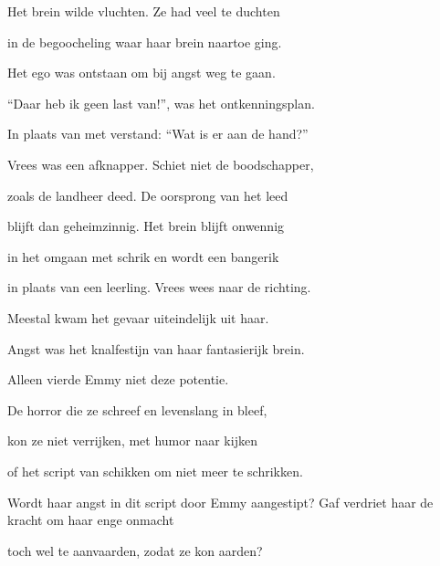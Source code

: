Het brein wilde vluchten.
Ze had veel te duchten

in de begoocheling
waar haar brein naartoe ging.

Het ego was ontstaan
om bij angst weg te gaan.

“Daar heb ik geen last van!”,
was het ontkenningsplan.

In plaats van met verstand:
“Wat is er aan de hand?”

Vrees was een afknapper.
Schiet niet de boodschapper,

zoals de landheer deed.
De oorsprong van het leed

blijft dan geheimzinnig.
Het brein blijft onwennig

in het omgaan met schrik
en wordt een bangerik

in plaats van een leerling.
Vrees wees naar de richting.

Meestal kwam het gevaar
uiteindelijk uit haar.

Angst was het knalfestijn
van haar fantasierijk brein.

Alleen vierde Emmy
niet deze potentie.

De horror die ze schreef
en levenslang in bleef,

kon ze niet verrijken,
met humor naar kijken

of het script van schikken
om niet meer te schrikken.

Wordt haar angst in dit script
door Emmy aangestipt?
Gaf verdriet haar de kracht
om haar enge onmacht

toch wel te aanvaarden,
zodat ze kon aarden?
